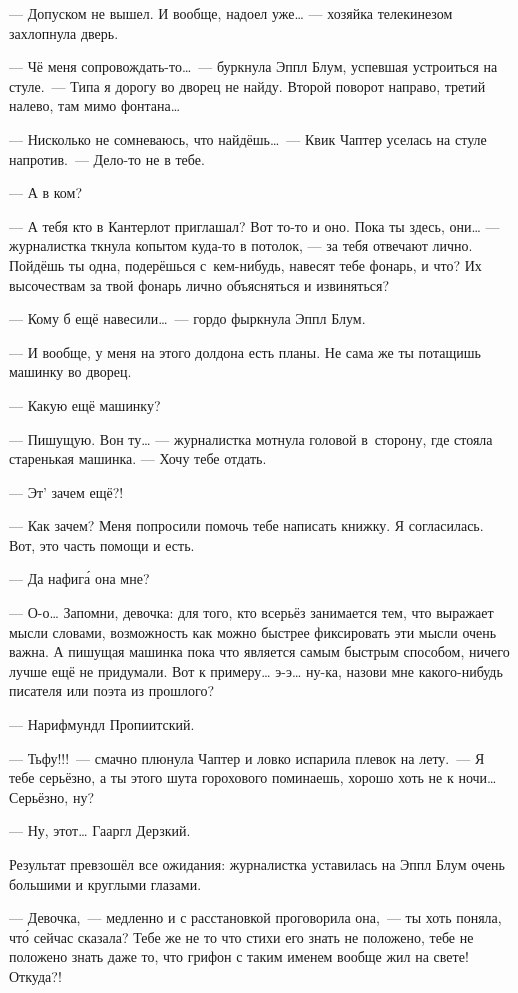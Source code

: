 \documentclass[fontsize=11pt,a5paper,titlepage=firstcover]{scrbook}
\begin{document}
--- Допуском не вышел. И вообще, надоел уже{\ldots} --- хозяйка телекинезом захлопнула дверь.

--- Чё меня сопровождать-то{\ldots}~--- буркнула Эппл Блум, успевшая устроиться на стуле.~--- Типа я дорогу во дворец не найду. Второй поворот направо, третий налево, там мимо фонтана{\ldots}

--- Нисколько не сомневаюсь, что найдёшь{\ldots}~--- Квик Чаптер уселась на стуле напротив.~--- Дело-то не в тебе.

--- А в ком?

--- А тебя кто в Кантерлот приглашал? Вот то-то и оно. Пока ты здесь, они{\ldots} --- журналистка ткнула копытом куда-то в потолок, --- за тебя отвечают лично. Пойдёшь ты одна, подерёшься с~кем-нибудь, навесят тебе фонарь, и что? Их высочествам за твой фонарь лично объясняться и извиняться?

--- Кому б ещё навесили{\ldots}~--- гордо фыркнула Эппл Блум.

--- И вообще, у меня на этого долдона есть планы. Не сама же ты потащишь машинку во дворец.

--- Какую ещё машинку?

--- Пишущую. Вон ту{\ldots} --- журналистка мотнула головой в~сторону, где стояла старенькая машинка. --- Хочу тебе отдать.

--- Эт’ зачем ещё?!

--- Как зачем? Меня попросили помочь тебе написать книжку. Я согласилась. Вот, это часть помощи и есть.

--- Да нафига́ она мне?

--- О-о{\ldots} Запомни, девочка: для того, кто всерьёз занимается тем, что выражает мысли словами, возможность как можно быстрее фиксировать эти мысли очень важна. А пишущая машинка пока что является самым быстрым способом, ничего лучше ещё не придумали. Вот к примеру{\ldots} э-э{\ldots} ну-ка, назови мне какого-нибудь писателя или поэта из прошлого?

--- Нарифмундл Пропиитский.

--- Тьфу!!!~--- смачно плюнула Чаптер и ловко испарила плевок на лету.~--- Я тебе серьёзно, а ты этого шута горохового поминаешь, хорошо хоть не к ночи{\ldots} Серьёзно, ну?

--- Ну, этот{\ldots} Гааргл Дерзкий.

Результат превзошёл все ожидания: журналистка уставилась на Эппл Блум очень большими и круглыми глазами.

--- Девочка,~--- медленно и с расстановкой проговорила она,~--- ты хоть поняла, что́ сейчас сказала? Тебе же не то что стихи его знать не положено, тебе не положено знать даже то, что грифон с таким именем вообще жил на свете! Откуда?!
\end{document}
